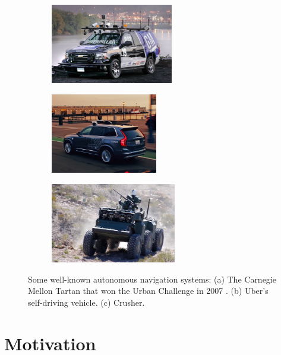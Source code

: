 \documentclass[../thesis.tex]{subfiles}
\begin{document}
 
\begin{figure}
    \centering
    \begin{subfigure}[b]{0.32\linewidth}
        \includegraphics[height=3.5cm]{./Introduction/fig/urban_challenge.jpg}
    \end{subfigure}
    \begin{subfigure}[b]{0.32\linewidth}
        \includegraphics[height=3.5cm]{./Introduction/fig/uber.jpg}
    \end{subfigure}
    \begin{subfigure}[b]{0.32\linewidth}
        \includegraphics[height=3.5cm]{./Introduction/fig/crusher.jpg}
    \end{subfigure}
    \caption{Some well-known autonomous navigation systems: (a) The Carnegie Mellon Tartan that won the Urban Challenge in 2007 \cite{boss}. (b) Uber's self-driving vehicle. (c) Crusher. \cite{stentz2007crusher}}
    \label{fig:uber_rock}
\end{figure}
 
\section{Motivation}
 
 
\end{document}
